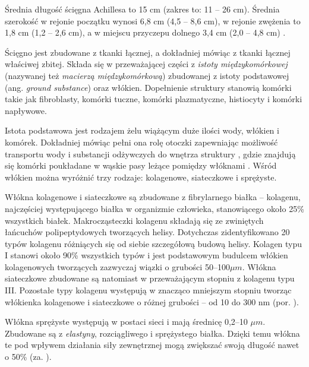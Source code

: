 Średnia długość ścięgna Achillesa to 15 cm (zakres to: 11 -- 26 cm). Średnia szerokość w rejonie początku wynosi 6,8 cm (4,5 -- 8,6 cm), w rejonie zwężenia to 1,8 cm (1,2 -- 2,6 cm), a w miejscu przyczepu dolnego 3,4 cm (2,0 -- 4,8 cm) \cite{Doral2010, KoivunenNiemel1995}.

Ścięgno jest zbudowane z tkanki łącznej, a dokładniej mówiąc z tkanki łącznej właściwej zbitej. Składa się w przeważającej części z \textit{istoty międzykomórkowej} (nazywanej też \textit{macierzą międzykomórkową}) zbudowanej z istoty podstawowej (ang. \textit{ground substance}) oraz włókien. Dopełnienie struktury stanowią komórki takie jak fibroblasty, komórki tuczne, komórki plazmatyczne, histiocyty i komórki napływowe. 

Istota podstawowa jest rodzajem żelu wiążącym duże ilości wody, włókien i komórek. Dokładniej mówiąc pełni ona rolę otoczki zapewniając możliwość transportu wody i substancji odżywczych do wnętrza struktury \cite{Sharma2006}, gdzie znajdują się komórki poukładane w wąskie pasy leżące pomiędzy włóknami \cite{Maffulli2005}. Wśród włókien można wyróżnić trzy rodzaje: kolagenowe, siateczkowe i sprężyste.

Włókna kolagenowe i siateczkowe są zbudowane z fibrylarnego białka -- kolagenu, najczęściej występującego białka w organizmie człowieka, stanowiącego około 25\% wszystkich białek. Makrocząsteczki kolagenu składają się ze zwiniętych łańcuchów polipeptydowych tworzących helisy. Dotychczas zidentyfikowano 20 typów kolagenu różniących się od siebie szczegółową budową helisy. Kolagen typu I stanowi około 90\% wszystkich typów i jest podstawowym budulcem włókien kolagenowych tworzących zazwyczaj wiązki o grubości 50--100$\mu$$m$. Włókna siateczkowe zbudowane są natomiast w przeważającym stopniu z kolagenu typu III. Pozostałe typy kolagenu występują w znacząco mniejszym stopniu tworząc włókienka kolagenowe i siateczkowe o różnej grubości -- od 10 do 300 nm (por. \cite{sawicki2008histologia}).

Włókna sprężyste występują w postaci sieci i mają średnicę 0,2--10 $\mu$$m$. Zbudowane są z \textit{elastyny}, rozciągliwego i sprężystego białka. Dzięki temu włókna te pod wpływem działania siły zewnętrznej mogą zwiększać swoją długość nawet o 50\% (za. \cite{sawicki2008histologia}). 

